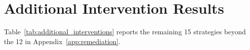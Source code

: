 \begin{table}[h]
\centering
\small
\caption{Method-level interventions on Mistral-7B with McNemar's paired test. All produce neutral-to-catastrophic results. Independent Constraint Generation (ICG) shows two FOLIO seeds; $p$ for the first. {*}{*}{*}\,$p < 0.001$; {*}{*}\,$p < 0.01$.}
\label{tab:method_interventions}
\end{table}

\section{Additional Intervention Results}
\label{app:additional-interventions}

Table~\ref{tab:additional_interventions} reports the remaining 15 strategies beyond the 12 in Appendix~\ref{app:remediation}.

